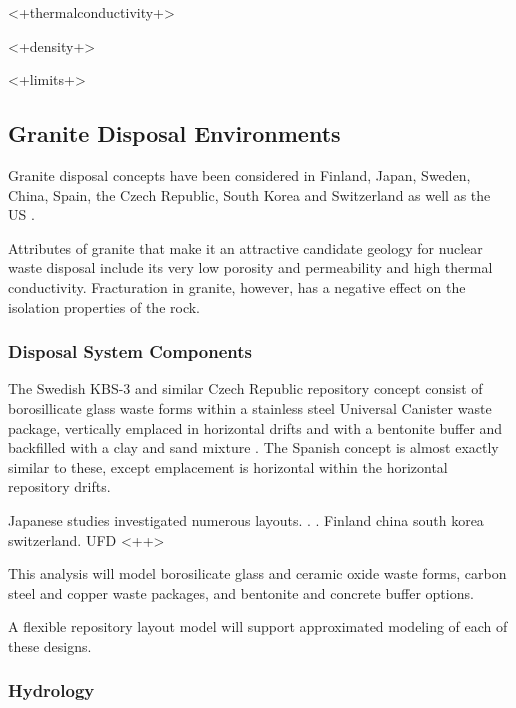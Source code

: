 {%

<+thermalconductivity+>

<+density+>

<+limits+>

\subsection{Granite Disposal Environments}

Granite disposal concepts have been considered in Finland, Japan, Sweden, China,  
Spain, the Czech Republic, South Korea and Switzerland as well as the \gls{US} 
\cite{hardin_generic_2011, andra_granite:_2005, von_lensa_red-impact_2008}. 

Attributes of granite that make it an attractive candidate geology for nuclear 
waste disposal include its very low porosity and permeability and high thermal 
conductivity. Fracturation in granite, however, has a negative effect on the 
isolation properties of the rock.  



\subsubsection{Disposal System Components}

The Swedish KBS-3 and similar Czech Republic repository concept consist of 
borosillicate glass waste forms within a stainless steel Universal Canister waste 
package, vertically emplaced in horizontal drifts and with a bentonite buffer  
and backfilled with a clay and sand mixture \cite{ab_long-term_2006, 
von_lensa_red-impact_2008}. The Spanish concept is almost exactly similar to 
these, except emplacement is horizontal within the horizontal repository drifts.


Japanese studies investigated numerous layouts. . .  Finland china south korea switzerland. 
UFD <++>

This analysis will model borosilicate glass and ceramic oxide waste forms, 
carbon steel and copper waste packages, and bentonite and concrete buffer 
options.  

A flexible repository layout model will support approximated modeling of
each of these designs.


\subsubsection{Hydrology}

}
